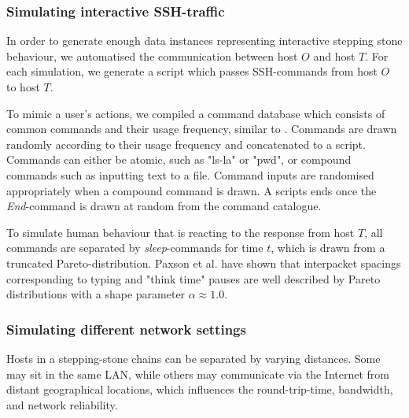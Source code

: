\subsubsection{Simulating interactive SSH-traffic}\label{SecN:Simulating_interactive}

In order to generate enough data instances representing interactive stepping stone behaviour, we automatised the communication between host $O$ and host $T$. For each simulation, we generate a script which passes SSH-commands from host $O$ to host $T$.%

To mimic a user's actions, we compiled a command database which consists of common commands and their usage frequency, similar to \cite{xin2006testbed}.%
Commands are drawn randomly according to their usage frequency and concatenated to a script. 
Commands can either be atomic, such as "ls-la" or "pwd", or compound commands such as inputting text to a file.
Command inputs are randomised appropriately when a compound command is drawn. A scripts ends once the \textit{End}-command is drawn at random from the command catalogue. 


To simulate human behaviour that is reacting to the response from host $T$, all commands are separated by \textit{sleep}-commands for time $t$, which is drawn from a truncated Pareto-distribution. Paxson et al. \cite{paxson1995wide} have shown that interpacket spacings corresponding to typing and "think time" pauses are well described by Pareto distributions with a shape parameter $\alpha\approx 1.0$. %


\vspace{-0.6cm}
\subsubsection{Simulating different network settings}\label{SecN:congestion}

Hosts in a stepping-stone chains can be separated by varying distances. Some may sit in the same LAN, while others may communicate via the Internet from distant geographical locations, which influences the round-trip-time, bandwidth, and network reliability. 

